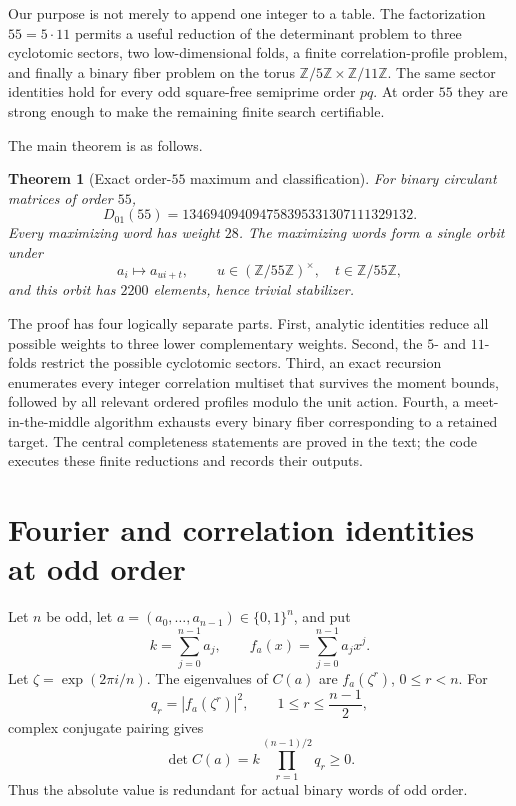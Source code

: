 \documentclass[11pt,a4paper]{article}
\newtheorem{theorem}{Theorem}
\theoremstyle{definition}
\theoremstyle{remark}
\newcommand{\Z}{\mathbb Z}
\newcommand{\M}{134694094094758395331307111329132}
\begin{document}
Our purpose is not merely to append one integer to a table.  The factorization
$55=5\cdot11$ permits a useful reduction of the determinant problem to three
cyclotomic sectors, two low-dimensional folds, a finite correlation-profile
problem, and finally a binary fiber problem on the torus
$\Z/5\Z\times\Z/11\Z$.  The same sector identities hold for every odd
square-free semiprime order $pq$.  At order $55$ they are strong enough to make
the remaining finite search certifiable.

The main theorem is as follows.

\begin{theorem}[Exact order-$55$ maximum and classification]
\label{thm:main}
For binary circulant matrices of order $55$,
\[
  D_{01}(55)=\M.
\]
Every maximizing word has weight $28$.  The maximizing words form a single
orbit under
\[
  a_i\longmapsto a_{ui+t},\qquad
  u\in(\Z/55\Z)^\times,\quad t\in\Z/55\Z,
\]
and this orbit has $2200$ elements, hence trivial stabilizer.
\end{theorem}

The proof has four logically separate parts.  First, analytic identities reduce
all possible weights to three lower complementary weights.  Second, the
$5$- and $11$-folds restrict the possible cyclotomic sectors.  Third, an exact
recursion enumerates every integer correlation multiset that survives the
moment bounds, followed by all relevant ordered profiles modulo the unit
action.  Fourth, a meet-in-the-middle algorithm exhausts every binary fiber
corresponding to a retained target.  The central completeness statements are
proved in the text; the code executes these finite reductions and records their
outputs.

\section{Fourier and correlation identities at odd order}
\label{sec:fourier}

Let $n$ be odd, let $a=(a_0,\ldots,a_{n-1})\in\{0,1\}^n$, and put
\[
  k=\sum_{j=0}^{n-1}a_j,\qquad
  f_a(x)=\sum_{j=0}^{n-1}a_jx^j.
\]
Let $\zeta=\exp(2\pi i/n)$.  The eigenvalues of $C(a)$ are
$f_a(\zeta^r)$, $0\le r<n$.  For
\[
  q_r=|f_a(\zeta^r)|^2,\qquad 1\le r\le \frac{n-1}{2},
\]
complex conjugate pairing gives
\begin{equation}
\label{eq:det-fourier-general}
  \det C(a)=k\prod_{r=1}^{(n-1)/2}q_r\ge0.
\end{equation}
Thus the absolute value is redundant for actual binary words of odd order.
\end{document}
